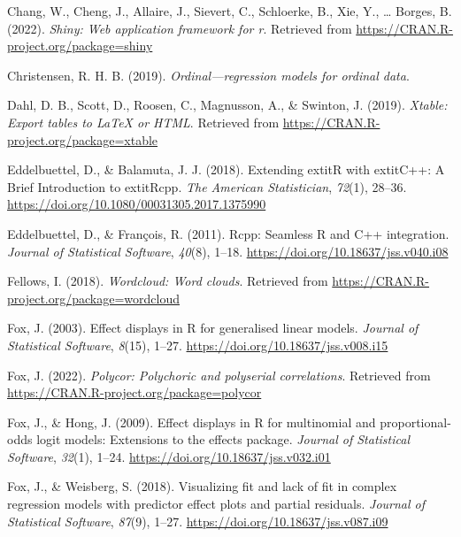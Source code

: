 \documentclass[
  english,
  man]{apa6}
\newlength{\cslhangindent}
\newlength{\cslentryspacingunit} %
\newenvironment{CSLReferences}[2] %
 {%
  \setlength{\parindent}{0pt}
  \ifodd #1
  \let\oldpar\par
  \def\par{\hangindent=\cslhangindent\oldpar}
  \fi
  \setlength{\parskip}{#2\cslentryspacingunit}
 }%
 {}
\begin{document}
\begin{CSLReferences}{1}{0}
\leavevmode{}%
Chang, W., Cheng, J., Allaire, J., Sievert, C., Schloerke, B., Xie, Y., \ldots{} Borges, B. (2022). \emph{Shiny: Web application framework for r}. Retrieved from \url{https://CRAN.R-project.org/package=shiny}

\leavevmode{}%
Christensen, R. H. B. (2019). \emph{Ordinal---regression models for ordinal data}.

\leavevmode{}%
Dahl, D. B., Scott, D., Roosen, C., Magnusson, A., \& Swinton, J. (2019). \emph{Xtable: Export tables to LaTeX or HTML}. Retrieved from \url{https://CRAN.R-project.org/package=xtable}

\leavevmode{}%
Eddelbuettel, D., \& Balamuta, J. J. (2018). {Extending extit{R} with extit{C++}: A Brief Introduction to extit{Rcpp}}. \emph{The American Statistician}, \emph{72}(1), 28--36. \url{https://doi.org/10.1080/00031305.2017.1375990}

\leavevmode{}%
Eddelbuettel, D., \& François, R. (2011). {Rcpp}: Seamless {R} and {C++} integration. \emph{Journal of Statistical Software}, \emph{40}(8), 1--18. \url{https://doi.org/10.18637/jss.v040.i08}

\leavevmode{}%
Fellows, I. (2018). \emph{Wordcloud: Word clouds}. Retrieved from \url{https://CRAN.R-project.org/package=wordcloud}

\leavevmode{}%
Fox, J. (2003). Effect displays in {R} for generalised linear models. \emph{Journal of Statistical Software}, \emph{8}(15), 1--27. \url{https://doi.org/10.18637/jss.v008.i15}

\leavevmode{}%
Fox, J. (2022). \emph{Polycor: Polychoric and polyserial correlations}. Retrieved from \url{https://CRAN.R-project.org/package=polycor}

\leavevmode{}%
Fox, J., \& Hong, J. (2009). Effect displays in {R} for multinomial and proportional-odds logit models: Extensions to the {effects} package. \emph{Journal of Statistical Software}, \emph{32}(1), 1--24. \url{https://doi.org/10.18637/jss.v032.i01}

\leavevmode{}%
Fox, J., \& Weisberg, S. (2018). Visualizing fit and lack of fit in complex regression models with predictor effect plots and partial residuals. \emph{Journal of Statistical Software}, \emph{87}(9), 1--27. \url{https://doi.org/10.18637/jss.v087.i09}


\end{CSLReferences}
\end{document}

